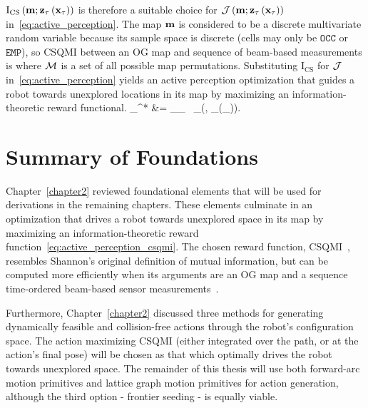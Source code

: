 $\text{I}_{\text{CS}}\left(\mathbf{m};\mathbf{z}_{\mathbf{\tau}}\left(\mathbf{x}_{\mathbf{\tau}}\right)\right)$
is therefore a suitable choice
for $\mathcal{J}\left(\mathbf{m}; \mathbf{z}_{\mathbf{\tau}}\left(\mathbf{x}_{\mathbf{\tau}}\right)\right)$
in~\eqref{eq:active_perception}. The map $\mathbf{m}$ is
considered to be a discrete multivariate random variable because its sample space is
discrete (cells may only be $\texttt{OCC}$ or $\texttt{EMP}$), so CSQMI between
an OG map and sequence of beam-based measurements is
%
%
where $\mathcal{M}$ is a set of all possible map permutations. Substituting
$\text{I}_{\text{CS}}$ for $\mathcal{J}$ in~\eqref{eq:active_perception} yields
an active perception optimization that guides a robot towards unexplored
locations in its map by maximizing an information-theoretic reward functional.
%
\eq
{
 _{\mbf{\tau}}^{*}
 &=
 \argmax_{_{\mbf{\tau}} \in {}}
 \
 _{}\left(,
 _{\mbf{\tau}}(_{\mbf{\tau}})\right).
 \label{eq:active_perception_csqmi}
}

\section{Summary of Foundations}

Chapter~\ref{chapter2} reviewed foundational elements that will be used for
derivations in the remaining chapters. These elements culminate in an
optimization that drives a robot towards unexplored space in its map by
maximizing an information-theoretic reward
function~\eqref{eq:active_perception_csqmi}. The chosen reward function,
CSQMI~\cite{principe2010information},
resembles Shannon's original definition of mutual information, but can be computed
more efficiently when its arguments are an OG map and a sequence
time-ordered beam-based sensor measurements~\cite{charrow2015icra}.

Furthermore, Chapter~\ref{chapter2} discussed three methods for generating
dynamically feasible and collision-free actions through the robot's
configuration space. The action maximizing CSQMI (either integrated over the
path, or at the action's final pose) will be chosen as that which optimally
drives the robot towards unexplored space. The remainder of this thesis will use both forward-arc
motion primitives and lattice graph motion primitives for action generation,
although the third option - frontier seeding - is equally viable.
